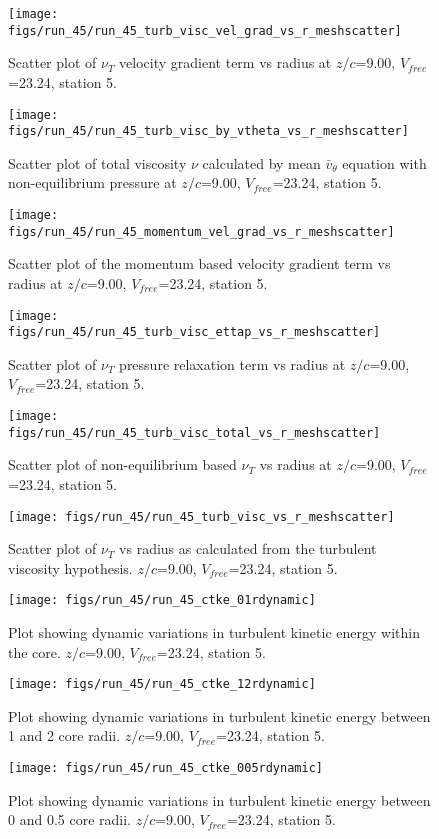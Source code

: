\begin{figure}[H]
\centering
\texttt{[image: figs/run\_45/run\_45\_turb\_visc\_vel\_grad\_vs\_r\_meshscatter]}
\caption{Scatter plot of $\nu_T$ velocity gradient term vs radius at $z/c$=9.00, $V_{free}$=23.24, station 5.}
\end{figure}


\begin{figure}[H]
\centering
\texttt{[image: figs/run\_45/run\_45\_turb\_visc\_by\_vtheta\_vs\_r\_meshscatter]}
\caption{Scatter plot of total viscosity $\nu$ calculated by mean $\bar{v}_{\theta}$ equation with non-equilibrium pressure at $z/c$=9.00, $V_{free}$=23.24, station 5.}
\end{figure}


\begin{figure}[H]
\centering
\texttt{[image: figs/run\_45/run\_45\_momentum\_vel\_grad\_vs\_r\_meshscatter]}
\caption{Scatter plot of the momentum based velocity gradient term vs radius at $z/c$=9.00, $V_{free}$=23.24, station 5.}
\end{figure}


\begin{figure}[H]
\centering
\texttt{[image: figs/run\_45/run\_45\_turb\_visc\_ettap\_vs\_r\_meshscatter]}
\caption{Scatter plot of $\nu_T$ pressure relaxation term vs radius at $z/c$=9.00, $V_{free}$=23.24, station 5.}
\end{figure}


\begin{figure}[H]
\centering
\texttt{[image: figs/run\_45/run\_45\_turb\_visc\_total\_vs\_r\_meshscatter]}
\caption{Scatter plot of non-equilibrium based $\nu_T$ vs radius at $z/c$=9.00, $V_{free}$=23.24, station 5.}
\end{figure}


\begin{figure}[H]
\centering
\texttt{[image: figs/run\_45/run\_45\_turb\_visc\_vs\_r\_meshscatter]}
\caption{Scatter plot of $\nu_T$ vs radius as calculated from the turbulent viscosity hypothesis. $z/c$=9.00, $V_{free}$=23.24, station 5.}
\end{figure}


\begin{figure}[H]
\centering
\texttt{[image: figs/run\_45/run\_45\_ctke\_01rdynamic]}
\caption{Plot showing dynamic variations in turbulent kinetic energy within the core. $z/c$=9.00, $V_{free}$=23.24, station 5.}
\end{figure}


\begin{figure}[H]
\centering
\texttt{[image: figs/run\_45/run\_45\_ctke\_12rdynamic]}
\caption{Plot showing dynamic variations in turbulent kinetic energy between 1 and 2 core radii. $z/c$=9.00, $V_{free}$=23.24, station 5.}
\end{figure}


\begin{figure}[H]
\centering
\texttt{[image: figs/run\_45/run\_45\_ctke\_005rdynamic]}
\caption{Plot showing dynamic variations in turbulent kinetic energy between 0 and 0.5 core radii. $z/c$=9.00, $V_{free}$=23.24, station 5.}
\end{figure}


